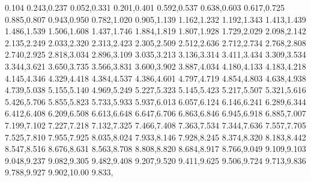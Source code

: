 0.104 0.243,0.237 0.052,0.331 0.201,0.401 0.592,0.537 0.638,0.603 0.617,0.725 0.885,0.807 0.943,0.950 0.782,1.020 0.905,1.139 1.162,1.232 1.192,1.343 1.413,1.439 1.486,1.539 1.506,1.608 1.437,1.746 1.884,1.819 1.807,1.928 1.729,2.029 2.098,2.142 2.135,2.249 2.033,2.320 2.313,2.423 2.305,2.509 2.512,2.636 2.712,2.734 2.768,2.808 2.740,2.925 2.818,3.034 2.896,3.109 3.035,3.213 3.136,3.314 3.411,3.434 3.309,3.534 3.344,3.621 3.650,3.735 3.566,3.831 3.600,3.902 3.887,4.034 4.180,4.133 4.183,4.218 4.145,4.346 4.329,4.418 4.384,4.537 4.386,4.601 4.797,4.719 4.854,4.803 4.638,4.938 4.739,5.038 5.155,5.140 4.969,5.249 5.227,5.323 5.145,5.423 5.217,5.507 5.321,5.616 5.426,5.706 5.855,5.823 5.733,5.933 5.937,6.013 6.057,6.124 6.146,6.241 6.289,6.344 6.412,6.408 6.209,6.508 6.613,6.648 6.647,6.706 6.863,6.846 6.945,6.918 6.885,7.007 7.199,7.102 7.227,7.218 7.132,7.325 7.466,7.408 7.363,7.534 7.344,7.636 7.557,7.705 7.525,7.810 7.955,7.925 8.035,8.024 7.933,8.146 7.928,8.245 8.374,8.320 8.183,8.442 8.547,8.516 8.676,8.631 8.563,8.708 8.808,8.820 8.684,8.917 8.766,9.049 9.109,9.103 9.048,9.237 9.082,9.305 9.482,9.408 9.207,9.520 9.411,9.625 9.506,9.724 9.713,9.836 9.788,9.927 9.902,10.00 9.833, 